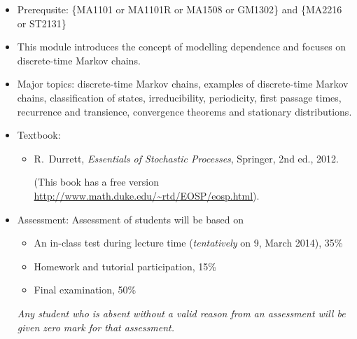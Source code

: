 \documentclass[a4paper]{article}
\begin{document}
\begin{itemize}
\item Prerequsite: \{MA1101 or MA1101R or MA1508 or GM1302\} and \{MA2216 or ST2131\}
  
\item
  This module introduces the concept of modelling dependence and focuses on discrete-time Markov chains. 
  
\item
  Major topics: discrete-time Markov chains, examples of discrete-time Markov chains, classification of states, irreducibility, periodicity, first passage times, recurrence and transience, convergence theorems and stationary distributions. 

\item Textbook:
  \begin{itemize}
  \item
    R.~Durrett, \emph{Essentials of Stochastic Processes}, Springer, 2nd ed., 2012.

    (This book has a free version \url{http://www.math.duke.edu/~rtd/EOSP/eosp.html}).
  \end{itemize}
\item Assessment:
  Assessment of students will be based on
  \begin{itemize}
  \item An in-class test during lecture time (\emph{tentatively} on 9, March 2014), 35\%
  \item Homework and tutorial participation, 15\%
  \item Final examination, 50\%
  \end{itemize}
  \emph{Any student who is absent without a valid reason from an assessment will be given zero mark for that assessment.}
\end{itemize}
\end{document}
